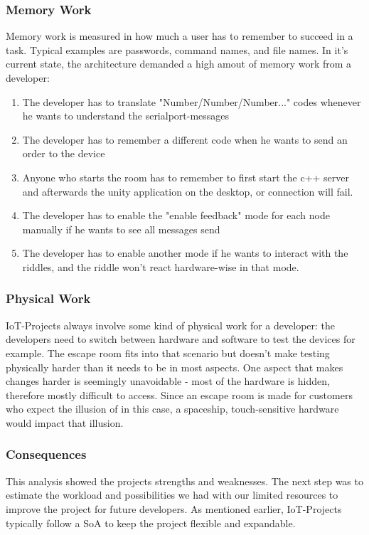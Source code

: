 \subsubsection{Memory Work}
Memory work is measured in how much a user has to remember to succeed in a task. 
Typical examples are passwords, command names, and file names.
In it's current state, the architecture demanded a high amout of memory work from a developer:
\begin{enumerate}
    \item The developer has to translate "Number/Number/Number..." codes whenever he wants to understand the serialport-messages 
    \item The developer has to remember a different code when he wants to send an order to the device
    \item Anyone who starts the room has to remember to first start the c++ server and afterwards the unity application on the desktop, or connection will fail.
    \item The developer has to enable the "enable feedback" mode for each node manually if he wants to see all messages send
    \item The developer has to enable another mode if he wants to interact with the riddles, and the riddle won't react hardware-wise in that mode.
\end{enumerate} 

\subsubsection{Physical Work}
IoT-Projects always involve some kind of physical work for a developer: the developers need to switch between hardware and software to test the devices for example.
The escape room fits into that scenario but doesn't make testing physically harder than it needs to be in most aspects. 
One aspect that makes changes harder is seemingly unavoidable - most of the hardware is hidden, therefore mostly difficult to access. 
Since an escape room is made for customers who expect the illusion of in this case, a spaceship, 
touch-sensitive hardware would impact that illusion.

\subsubsection{Consequences}
This analysis showed the projects strengths and weaknesses. 
The next step was to estimate the workload and possibilities 
we had with our limited resources to improve the project for future developers. 
As mentioned earlier, IoT-Projects typically follow a SoA %
to keep the project flexible and expandable. 

